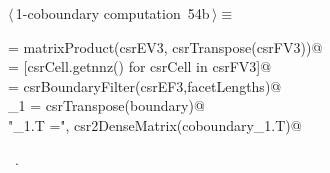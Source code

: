 \documentclass[11pt,oneside]{article}    %
\begin{document}
\begin{flushleft} \small \label{scrap94}
\protect{}$\langle\,$1-coboundary computation\nobreak\ {\footnotesize 54b}$\,\rangle\equiv$
\vspace{-1ex}
\begin{list}{}{} \item
\mbox{} = matrixProduct(csrEV3, csrTranspose(csrFV3))@\\
\mbox{}\verb@facetLengths = [csrCell.getnnz() for csrCell in csrFV3]@\\
\mbox{}\verb@boundary = csrBoundaryFilter(csrEF3,facetLengths)@\\
\mbox{}\verb@coboundary_1 = csrTranspose(boundary)@\\
\mbox{}\verb@print "\ncoboundary_1.T =\n", csr2DenseMatrix(coboundary_1.T)@\\
\mbox{}\verb@@{\NWsep}
\end{list}
\vspace{-1ex}
\footnotesize\addtolength{\baselineskip}{-1ex}
\begin{list}{}{\setlength{\itemsep}{-\parsep}\setlength{\itemindent}{-\leftmargin}}
\item \NWtxtMacroRefIn\ .
\end{list}
\end{flushleft}
\end{document}
